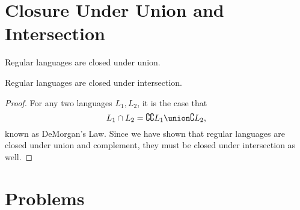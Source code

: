 \section{Closure Under Union and Intersection}

\begin{theorem}
	Regular languages are closed under union.
\end{theorem}


\begin{corollary}
	Regular languages are closed under intersection.
\end{corollary}

\begin{proof}
	For any two languages $L_1, L_2$, it is the case that
	\[
		L_1 \cap L_2 = \complement{\complement{L_1} \union \complement{L_2}},
	\]
	known as DeMorgan's Law. 
	Since we have shown that regular languages are closed under union and complement, they must be closed under intersection as well.
\end{proof}

\section{Problems}


